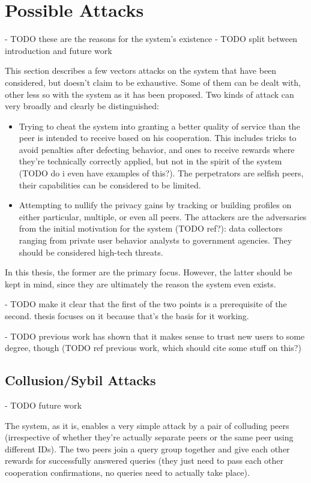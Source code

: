 \section{Possible Attacks}
- TODO these are the reasons for the system's existence
- TODO split between introduction and future work

This section describes a few vectors attacks on the system that have been
considered, but doesn't claim to be exhaustive. Some of them can be dealt with,
other less so with the system as it has been proposed. Two kinds of attack can
very broadly and clearly be distinguished:
\begin{itemize}
\item Trying to cheat the system into granting a better quality of service than
the peer is intended to receive based on his cooperation. This includes tricks
to avoid penalties after defecting behavior, and ones to receive rewards where
they're technically correctly applied, but not in the spirit of the system (TODO
do i even have examples of this?). The perpetrators are selfish peers, their
capabilities can be considered to be limited.
\item Attempting to nullify the privacy gains by tracking or building profiles
on either particular, multiple, or even all peers. The attackers are the
adversaries from the initial motivation for the system (TODO ref?): data
collectors ranging from private user behavior analysts to government agencies.
They should be considered high-tech threats.
\end{itemize}

In this thesis, the former are the primary focus. However, the latter should be
kept in mind, since they are ultimately the reason the system even exists.

- TODO make it clear that the first of the two points is a prerequisite of the
  second. thesis focuses on it because that's the basis for it working.

- TODO previous work has shown that it makes sense to trust new users to some
  degree, though
(TODO ref previous work, which should cite some stuff on this?)

\subsection{Collusion/Sybil Attacks}
\label{sec:desc_collusion_sybil_attacks}
- TODO future work

The system, as it is, enables a very simple attack by a pair of colluding peers
(irrespective of whether they're actually separate peers or the same peer using
different IDs). The two peers join a query group together and give each other
rewards for successfully answered queries (they just need to pass each other
cooperation confirmations, no queries need to actually take place).

